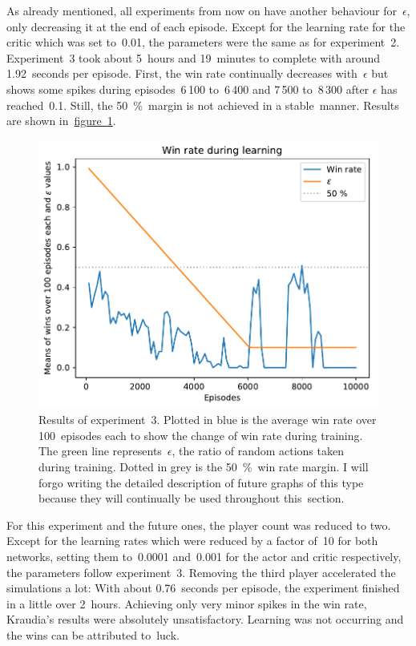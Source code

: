 \documentclass[a4paper,titlepage]{article}
\begin{document}
As already mentioned, all experiments from now on have another behaviour for~$\epsilon$, only decreasing it at the end of each episode.
Except for the learning rate for the critic which was set to~0.01, the parameters were the same as for experiment~2. Experiment~3 took about 5~hours and 19~minutes to complete with around 1.92~seconds per episode. First, the win rate continually decreases with~$\epsilon$ but shows some spikes during episodes~6\,100 to~6\,400 and 7\,500 to~8\,300 after $\epsilon$ has reached~0.1. Still, the 50~\%~margin is not achieved in a stable~manner. Results are shown in~\hyperref[fig:exp3]{figure~\ref*{fig:exp3}}.
\begin{figure}[t]
  \centering
  \includegraphics[width=\textwidth]{../experiments/exp3/win_stats.pdf}
  \caption{Results of experiment~3. Plotted in blue is the average win rate over 100~episodes each to show the change of win rate during training. The green line represents~$\epsilon$, the ratio of random actions taken during training. Dotted in grey is the 50~\%~win rate margin. I will forgo writing the detailed description of future graphs of this type because they will continually be used throughout this~section.}
  \label{fig:exp3}
\end{figure}

For this experiment and the future ones, the player count was reduced to two. Except for the learning rates which were reduced by a factor of~10 for both networks, setting them to~0.0001 and~0.001 for the actor and critic respectively, the parameters follow experiment~3. Removing the third player accelerated the simulations a lot: With about 0.76~seconds per episode, the experiment finished in a little over 2~hours. Achieving only very minor spikes in the win rate, Kraudia's results were absolutely unsatisfactory. Learning was not occurring and the wins can be attributed to~luck. \medskip
\end{document}

